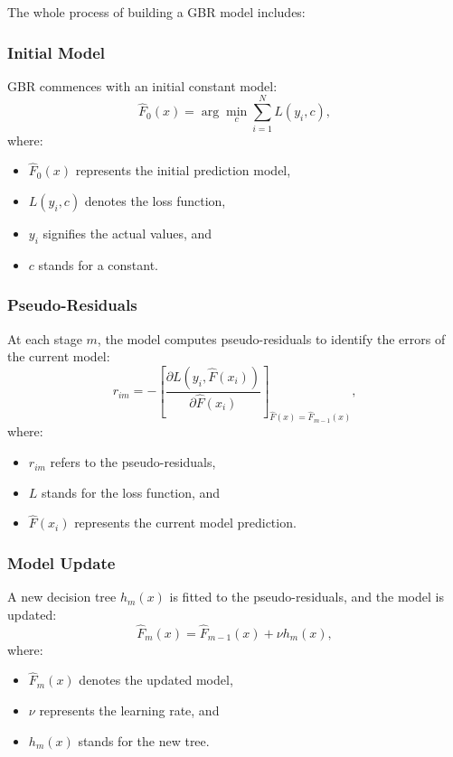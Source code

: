 \documentclass{ieeeojies}
\begin{document}
The whole process of building a GBR model includes:
\subsubsection{Initial Model}

GBR commences with an initial constant model:
\begin{equation}
    \hat{F}_0(x) = \arg\min_{c} \sum_{i=1}^{N} L(y_i, c),
\end{equation}
where:
\begin{itemize}
    \item \(\hat{F}_0(x)\) represents the initial prediction model,
    \item \(L(y_i, c)\) denotes the loss function,
    \item \(y_i\) signifies the actual values, and
    \item \(c\) stands for a constant.
\end{itemize}

\subsubsection{Pseudo-Residuals}

At each stage \(m\), the model computes pseudo-residuals to identify the errors of the current model:
\begin{equation}
    r_{im} = -\left[\frac{\partial L(y_i, \hat{F}(x_i))}{\partial \hat{F}(x_i)}\right]_{\hat{F}(x) = \hat{F}_{m-1}(x)},
\end{equation}
where:
\begin{itemize}
    \item \(r_{im}\) refers to the pseudo-residuals,
    \item \(L\) stands for the loss function, and
    \item \(\hat{F}(x_i)\) represents the current model prediction.
\end{itemize}

\subsubsection{Model Update}

A new decision tree \(h_m(x)\) is fitted to the pseudo-residuals, and the model is updated:
\begin{equation}
    \hat{F}_m(x) = \hat{F}_{m-1}(x) + \nu h_m(x),
\end{equation}
where:
\begin{itemize}
    \item \(\hat{F}_m(x)\) denotes the updated model,
    \item \(\nu\) represents the learning rate, and
    \item \(h_m(x)\) stands for the new tree.
\end{itemize}
\end{document}
